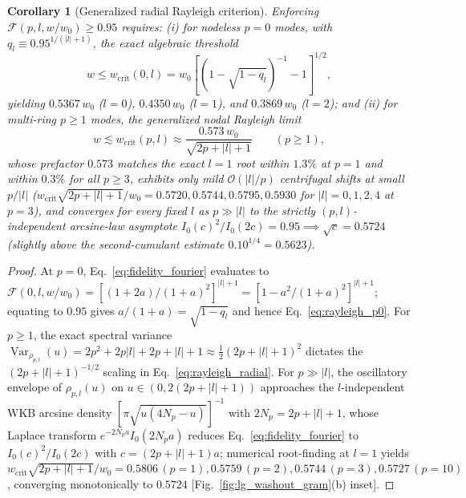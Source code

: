 \documentclass[aps,pra,onecolumn,notitlepage,11pt,tightenlines,nofootinbib,floatfix,longbibliography]{revtex4-2}
\newtheorem{corollary}{Corollary}
\theoremstyle{remark}
\newcommand{\abs}[1]{\lvert #1 \rvert}
\begin{document}
\begin{corollary}[Generalized radial Rayleigh criterion]
\label{cor:rayleigh_radial}
Enforcing $\mathcal{F}(p,l,w/w_0) \ge 0.95$ requires: (i) for nodeless $p = 0$ modes, with $q_l \equiv 0.95^{1/(\abs{l}+1)}$, the exact algebraic threshold
\begin{equation}
w \le w_{\mathrm{crit}}(0,l) = w_0 \left[\left(1 - \sqrt{1 - q_l}\right)^{-1} - 1\right]^{1/2},
\label{eq:rayleigh_p0}
\end{equation}
yielding $0.5367\,w_0$ ($l = 0$), $0.4350\,w_0$ ($l = 1$), and $0.3869\,w_0$ ($l = 2$); and (ii) for multi-ring $p \ge 1$ modes, the generalized nodal Rayleigh limit
\begin{equation}
w \lesssim w_{\mathrm{crit}}(p,l) \approx \frac{0.573\,w_0}{\sqrt{2p + \abs{l} + 1}} \qquad (p \ge 1),
\label{eq:rayleigh_radial}
\end{equation}
whose prefactor $0.573$ matches the exact $l = 1$ root within $1.3\%$ at $p = 1$ and within $0.3\%$ for all $p \ge 3$, exhibits only mild $\mathcal{O}(\abs{l}/p)$ centrifugal shifts at small $p/\abs{l}$ ($w_{\mathrm{crit}}\sqrt{2p+\abs{l}+1}/w_0 = 0.5720, 0.5744, 0.5795, 0.5930$ for $\abs{l} = 0,1,2,4$ at $p = 3$), and converges for every fixed $l$ as $p \gg \abs{l}$ to the strictly $(p,l)$-independent arcsine-law asymptote $I_0(c)^2/I_0(2c) = 0.95 \implies \sqrt{c} = 0.5724$ (slightly above the second-cumulant estimate $0.10^{1/4} = 0.5623$).
\end{corollary}
\begin{proof}
At $p = 0$, Eq.~\eqref{eq:fidelity_fourier} evaluates to $\mathcal{F}(0,l,w/w_0) = [(1+2a)/(1+a)^2]^{\abs{l}+1} = [1 - a^2/(1+a)^2]^{\abs{l}+1}$; equating to $0.95$ gives $a/(1+a) = \sqrt{1 - q_l}$ and hence Eq.~\eqref{eq:rayleigh_p0}. For $p \ge 1$, the exact spectral variance $\operatorname{Var}_{\rho_{p,l}}(u) = 2p^2 + 2p\abs{l} + 2p + \abs{l} + 1 \approx \frac{1}{2}(2p+\abs{l}+1)^2$ dictates the $(2p+\abs{l}+1)^{-1/2}$ scaling in Eq.~\eqref{eq:rayleigh_radial}. For $p \gg \abs{l}$, the oscillatory envelope of $\rho_{p,l}(u)$ on $u \in (0, 2(2p+\abs{l}+1))$ approaches the $l$-independent WKB arcsine density $[\pi\sqrt{u(4N_p-u)}]^{-1}$ with $2N_p = 2p+\abs{l}+1$, whose Laplace transform $e^{-2N_p a}I_0(2N_p a)$ reduces Eq.~\eqref{eq:fidelity_fourier} to $I_0(c)^2/I_0(2c)$ with $c = (2p+\abs{l}+1)a$; numerical root-finding at $l = 1$ yields $w_{\mathrm{crit}}\sqrt{2p+\abs{l}+1}/w_0 = 0.5806\,(p=1), 0.5759\,(p=2), 0.5744\,(p=3), 0.5727\,(p=10)$, converging monotonically to $0.5724$ [Fig.~\ref{fig:lg_washout_gram}(b) inset].
\end{proof}
\end{document}
